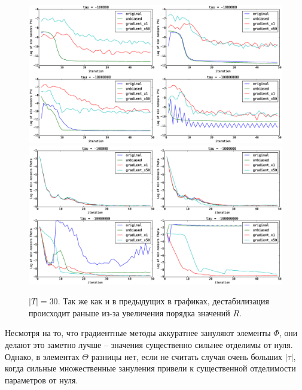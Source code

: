 \documentclass[12pt]{article}
\begin{document}
\begin{figure}[H]
	\centering
	\caption{$|T| = 30$. Так же как и в предыдущих в графиках, дестабилизация происходит раньше из-за увеличения порядка значений $R$.}    
	\includegraphics[width=1.0\linewidth]{pictures/topics_30_minPhi_values}
	\includegraphics[width=1.0\linewidth]{pictures/topics_30_minTheta_values}
\end{figure}

Несмотря на то, что градиентные методы аккуратнее  зануляют элементы $\Phi$, они делают это заметно лучше -- значения существенно сильнее отделимы от нуля. Однако, в элементах $\Theta$ разницы нет, если не считать случая очень больших $|\tau|$, когда сильные множественные зануления привели к существенной отделимости параметров от нуля.
\end{document}
